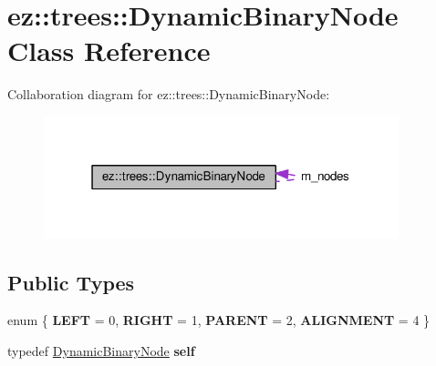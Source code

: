 \hypertarget{classez_1_1trees_1_1DynamicBinaryNode}{}\section{ez\+:\+:trees\+:\+:Dynamic\+Binary\+Node Class Reference}
\label{classez_1_1trees_1_1DynamicBinaryNode}


Collaboration diagram for ez\+:\+:trees\+:\+:Dynamic\+Binary\+Node\+:
\nopagebreak
\begin{figure}[H]
\begin{center}
\leavevmode
\includegraphics[width=292pt]{classez_1_1trees_1_1DynamicBinaryNode__coll__graph}
\end{center}
\end{figure}
\subsection*{Public Types}
\begin{DoxyCompactItemize}
\item 
\mbox{\label{classez_1_1trees_1_1DynamicBinaryNode_a4bcbddfe8cdea01a78faab44a00ccc54}} 
enum \{ {\bfseries L\+E\+FT} = 0, 
{\bfseries R\+I\+G\+HT} = 1, 
{\bfseries P\+A\+R\+E\+NT} = 2, 
{\bfseries A\+L\+I\+G\+N\+M\+E\+NT} = 4
 \}
\item 
\mbox{\label{classez_1_1trees_1_1DynamicBinaryNode_a2bcb4fe8c63f5fe47a2aa49dd8e7d803}} 
typedef \hyperlink{classez_1_1trees_1_1DynamicBinaryNode}{Dynamic\+Binary\+Node} {\bfseries self}
\end{DoxyCompactItemize}
